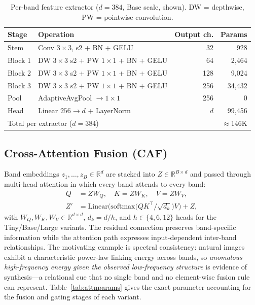 \documentclass[journal]{IEEEtran}
\begin{document}
\begin{table}[!t]
\renewcommand{\arraystretch}{1.2}
\caption{Per-band feature extractor ($d = 384$, Base scale, shown). DW = depthwise, PW = pointwise convolution.}
\label{tab:extractor}
\centering
\setlength{\tabcolsep}{4pt}
\begin{tabular}{llrr}
\toprule
Stage & Operation & Output ch. & Params \\
\midrule
Stem    & Conv $3{\times}3$, s2 + BN + GELU        & 32  & 928 \\
Block 1 & DW $3{\times}3$ s2 + PW $1{\times}1$ + BN + GELU & 64  & 2{,}464 \\
Block 2 & DW $3{\times}3$ s2 + PW $1{\times}1$ + BN + GELU & 128 & 9{,}024 \\
Block 3 & DW $3{\times}3$ s2 + PW $1{\times}1$ + BN + GELU & 256 & 34{,}432 \\
Pool    & AdaptiveAvgPool $\rightarrow 1{\times}1$  & 256 & 0 \\
Head    & Linear $256 \rightarrow d$ + LayerNorm    & $d$ & 99{,}456 \\
\midrule
\multicolumn{3}{l}{Total per extractor ($d=384$)} & $\approx$146K \\
\bottomrule
\end{tabular}
\end{table}

\subsection{Cross-Attention Fusion (CAF)}
\label{sec:caf}
Band embeddings $z_1,\dots,z_B \in \mathbb{R}^{d}$ are stacked into $Z \in \mathbb{R}^{B \times d}$ and passed through multi-head attention in which every band attends to every band:
\begin{align}
Q &= ZW_Q, \quad K = ZW_K, \quad V = ZW_V, \label{eq:qkv}\\
Z' &= \mathrm{Linear}\!\big(\mathrm{softmax}\!\big(QK^{\!\top}\!/\sqrt{d_k}\big)V\big) + Z, \label{eq:attn}
\end{align}
with $W_Q, W_K, W_V \in \mathbb{R}^{d \times d}$, $d_k = d/h$, and $h \in \{4, 6, 12\}$ heads for the Tiny/Base/Large variants. The residual connection preserves band-specific information while the attention path expresses input-dependent inter-band relationships. The motivating example is spectral consistency: natural images exhibit a characteristic power-law linking energy across bands, so \emph{anomalous high-frequency energy given the observed low-frequency structure} is evidence of synthesis---a relational cue that no single band and no element-wise fusion rule can represent. Table~\ref{tab:attnparams} gives the exact parameter accounting for the fusion and gating stages of each variant.
\end{document}
